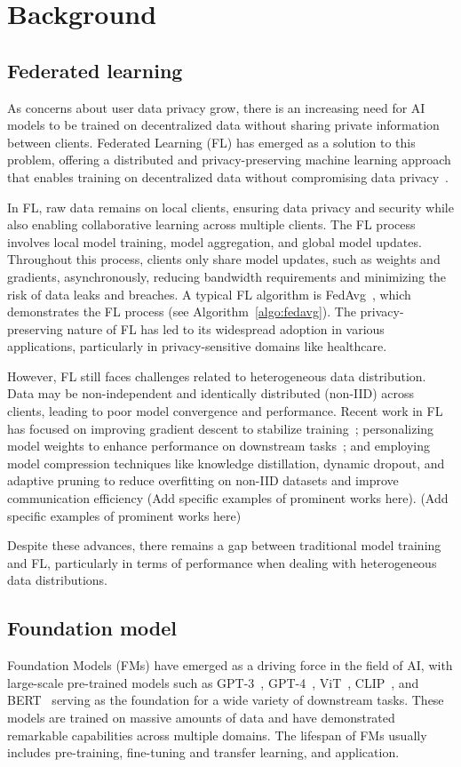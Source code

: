 \section{Background}
\subsection{Federated learning}
As concerns about user data privacy grow, there is an increasing need for AI models to be trained on decentralized data without sharing private information between clients. Federated Learning (FL) has emerged as a solution to this problem, offering a distributed and privacy-preserving machine learning approach that enables training on decentralized data without compromising data privacy~\cite{}.


In FL, raw data remains on local clients, ensuring data privacy and security while also enabling collaborative learning across multiple clients. The FL process involves local model training, model aggregation, and global model updates. Throughout this process, clients only share model updates, such as weights and gradients, asynchronously, reducing bandwidth requirements and minimizing the risk of data leaks and breaches.
A typical FL algorithm is FedAvg~\cite{}, which demonstrates the FL process (see Algorithm~\ref{algo:fedavg}). The privacy-preserving nature of FL has led to its widespread adoption in various applications, particularly in privacy-sensitive domains like healthcare.



However, FL still faces challenges related to heterogeneous data distribution. Data may be non-independent and identically distributed (non-IID) across clients, leading to poor model convergence and performance. Recent work in FL has focused on improving gradient descent to stabilize training~\cite{}; personalizing model weights to enhance performance on downstream tasks~\cite{}; and employing model compression techniques like knowledge distillation, dynamic dropout, and adaptive pruning to reduce overfitting on non-IID datasets and improve communication efficiency (Add specific examples of prominent works here).
(Add specific examples of prominent works here)

Despite these advances, there remains a gap between traditional model training and FL, particularly in terms of performance when dealing with heterogeneous data distributions.




\subsection{Foundation model}
Foundation Models (FMs) have emerged as a driving force in the field of AI, with large-scale pre-trained models such as GPT-3~\cite{}, GPT-4~\cite{}, ViT~\cite{}, CLIP~\cite{}, and BERT~\cite{} serving as the foundation for a wide variety of downstream tasks. These models are trained on massive amounts of data and have demonstrated remarkable capabilities across multiple domains. 
The lifespan of FMs usually includes pre-training, fine-tuning and transfer learning, and application.

